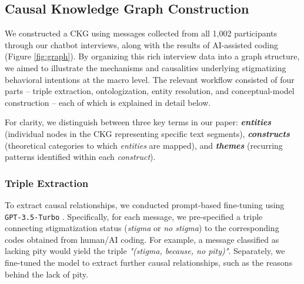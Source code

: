 \subsection{Causal Knowledge Graph Construction} %
\label{method:ckg}

We constructed a CKG using messages collected from all 1,002 participants through our chatbot interviews, along with the results of AI-assisted coding (Figure \ref{fig:graph}). 
By organizing this rich interview data into a graph structure, we aimed to illustrate the mechanisms and causalities underlying stigmatizing behavioral intentions at the macro level. 
The relevant workflow consisted of four parts – triple extraction, ontologization, entity resolution, and conceptual-model construction – each of which is explained in detail below. 

For clarity, we distinguish between three key terms in our paper: \textit{\textbf{entities}} (individual nodes in the CKG representing specific text segments), \textbf{\textit{constructs}} (theoretical categories to which \textit{entities} are mapped), and \textbf{\textit{themes}} (recurring patterns identified within each \textit{construct}).


\subsubsection{Triple Extraction}

To extract causal relationships, we conducted prompt-based fine-tuning using \texttt{GPT-3.5-Turbo} \cite{kg_carta_2023}. 
Specifically, for each message, we pre-specified a triple connecting stigmatization status (\textit{stigma} or \textit{no stigma}) to the corresponding codes obtained from human/AI coding. 
For example, a message classified as lacking pity would yield the triple \textit{"(stigma, because, no pity)"}. 
Separately, we fine-tuned the model to extract further causal relationships, such as the reasons behind the lack of pity.


